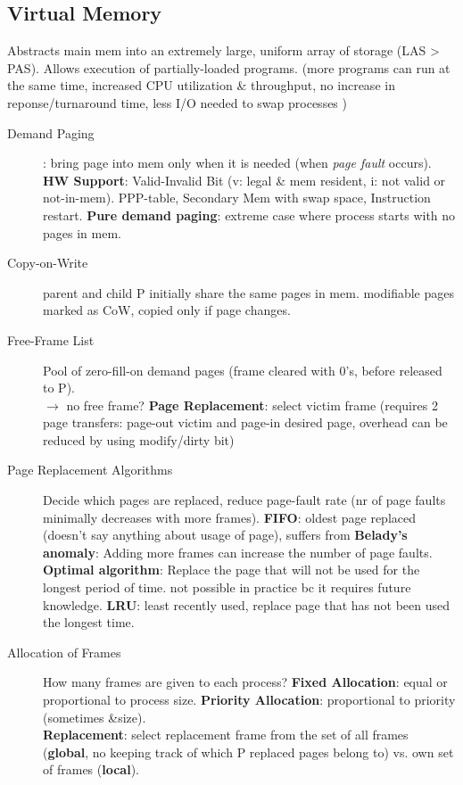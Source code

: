 \subsection*{Virtual Memory}
Abstracts main mem into an extremely large, uniform array of storage (LAS > PAS). Allows execution of partially-loaded programs. (more programs can run at the same time, increased CPU utilization \& throughput, no increase in reponse/turnaround time, less I/O needed to swap processes )
\begin{description}
    \item[Demand Paging]: bring page into mem only when it is needed (when \textit{page fault} occurs). \textbf{HW Support}: Valid-Invalid Bit (v: legal & mem resident, i: not valid or not-in-mem). PPP-table, Secondary Mem with swap space, Instruction restart. \textbf{Pure demand paging}: extreme case where process starts with no pages in mem.
    \item[Copy-on-Write]parent and child P initially share the same pages in mem. modifiable pages marked as CoW, copied only if page changes.
    \item[Free-Frame List]Pool of zero-fill-on demand pages (frame cleared with 0's, before released to P). \\
    $\rightarrow$ no free frame? \textbf{Page Replacement}: select victim frame (requires 2 page transfers: page-out victim and page-in desired page, overhead can be reduced by using modify/dirty bit) %
    \item[Page Replacement Algorithms] Decide which pages are replaced, reduce page-fault rate (nr of page faults minimally decreases with more frames). \textbf{FIFO}: oldest page replaced (doesn't say anything about usage of page), suffers from \textbf{Belady's anomaly}: Adding more frames can increase the number of page faults. \textbf{Optimal algorithm}: Replace the page that will not be used for the longest period of time. not possible in practice bc it  requires future knowledge. \textbf{LRU}: least recently used, replace page that has not been used the longest time.
    \item[Allocation of Frames]How many frames are given to each process? \textbf{Fixed Allocation}: equal or proportional to process size. \textbf{Priority Allocation}: proportional to priority (sometimes &size). \\
        \textbf{Replacement}: select replacement frame from the set of all frames (\textbf{global}, no keeping track of which P replaced pages belong to) vs. own set of frames (\textbf{local}).

\end{description}
